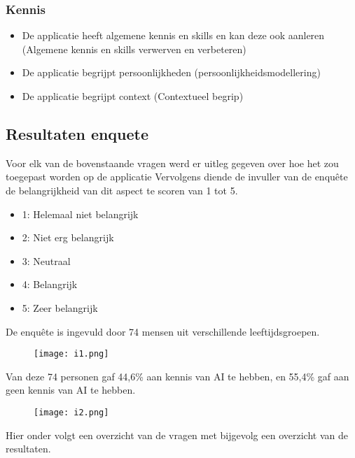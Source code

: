 \subsubsection{Kennis}

\begin{itemize}
    \item De applicatie heeft algemene kennis en skills en kan deze ook aanleren (Algemene kennis en skills verwerven en verbeteren)
    \item De applicatie begrijpt persoonlijkheden (persoonlijkheidsmodellering)
    \item De applicatie begrijpt context (Contextueel begrip)
\end{itemize}

\subsection{Resultaten enquete}

Voor elk van de bovenstaande vragen werd er uitleg gegeven over hoe het zou toegepast worden op de applicatie Vervolgens diende de invuller van de enquête de belangrijkheid van dit aspect te scoren van 1 tot 5.

\begin{itemize}
    \item 1: Helemaal niet belangrijk
    \item 2: Niet erg belangrijk
    \item 3: Neutraal
    \item 4: Belangrijk
    \item 5: Zeer belangrijk
\end{itemize}

De enquête is ingevuld door 74 mensen uit verschillende leeftijdsgroepen.

\begin{figure}[htbp]
    \centering
    \texttt{[image: i1.png]}
    \label{fig:leeftijdsgroepen_resultaat}
\end{figure}

Van deze 74 personen gaf 44,6\% aan kennis van AI te hebben, en 55,4\% gaf aan geen kennis van AI te hebben.

\begin{figure}[htbp]
    \centering
    \texttt{[image: i2.png]}
    \label{fig:ai_kennis_resultaat}
\end{figure}

Hier onder volgt een overzicht van de vragen met bijgevolg een overzicht van de resultaten.

